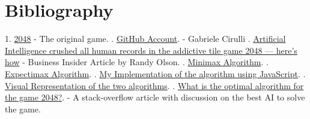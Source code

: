\documentclass[english]{article}
\begin{document}
\section*{Bibliography}
1. \href{https://gabrielecirulli.github.io/2048/}{2048} - The original game. . \href{https://github.com/gabrielecirulli}{GitHub Account}. - Gabriele Cirulli . \href{http://www.businessinsider.com/artificial-intelligence-crushed-all-human-records-in-the-addictive-tile-game-2048--heres-how-2015-5}{Artificial Intelligence crushed all human records in the addictive tile game 2048 — here's how} - Business Insider Article by Randy Olson. . \href{https://en.wikipedia.org/wiki/Minimax}{Minimax Algorithm}. . \href{https://en.wikipedia.org/wiki/Expectiminimax_tree}{Expectimax Algorithm}. . \href{https://github.com/samanjate/2048-solver}{My Implementation of the algorithm using JavaScript}. . \href{https://twenty48-solver.herokuapp.com/index.html}{Visual Representation of the two algorithms}. . \href{https://stackoverflow.com/questions/22342854/what-is-the-optimal-algorithm-for-the-game-2048}{What is the optimal algorithm for the game 2048?}. - A stack-overflow article with discussion on the best AI to solve the game. \newline
\end{document}
